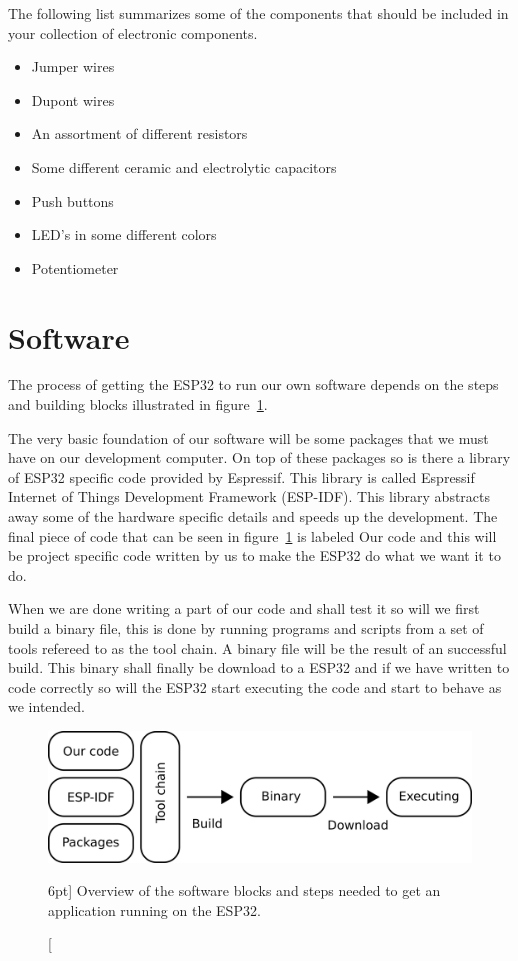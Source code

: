 \documentclass{tufte-book}
\begin{document}
The following list summarizes some of the components that should be included in 
your collection of electronic components.

\begin{itemize}
	\item Jumper wires
	\item Dupont wires
	\item An assortment of different resistors
	\item Some different ceramic and electrolytic capacitors
	\item Push buttons
	\item LED's in some different colors 
	\item Potentiometer
\end{itemize}

\section{Software}\label{sec:software}

The process of getting the ESP32 to run our own software depends on the steps and building blocks illustrated in figure~\ref{fig:software_anatomy}.

The very basic foundation of our software will be some packages that we must have on our development computer. On top of these packages so is there a library of ESP32 specific code provided by Espressif. This library is called Espressif Internet of Things Development Framework (ESP-IDF). This library abstracts away some of the hardware specific details and speeds up the development. The final piece of code that can be seen in figure~\ref{fig:software_anatomy} is labeled Our code and this will be project specific code written by us to make the ESP32 do what we want it to do.

When we are done writing a part of our code and shall test it so will we first build a binary file, this is done by running programs and scripts from a set of tools refereed to as the tool chain. A binary file will be the result of an successful build. This binary shall finally be download to a ESP32 and if we have written to code correctly so will the ESP32 start executing the code and start to behave as we intended. 

\begin{figure}
	\includegraphics[scale=1.0]{software_anatomy.png}
	\caption[Software development $n$.][6pt]{
	Overview of the software blocks and steps needed to get an application
	running on the ESP32.
	}
	\label{fig:software_anatomy}
\end{figure}
\end{document}
